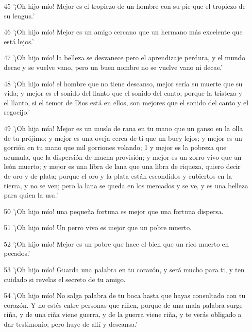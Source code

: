 \par 45 '¡Oh hijo mío! Mejor es el tropiezo de un hombre con su pie que el tropiezo de su lengua.'

\par 46 '¡Oh hijo mío! Mejor es un amigo cercano que un hermano más excelente que está lejos.'

\par 47 '¡Oh hijo mío! la belleza se desvanece pero el aprendizaje perdura, y el mundo decae y se vuelve vano, pero un buen nombre no se vuelve vano ni decae.'

\par 48 '¡Oh hijo mío! el hombre que no tiene descanso, mejor sería su muerte que su vida; y mejor es el sonido del llanto que el sonido del canto; porque la tristeza y el llanto, si el temor de Dios está en ellos, son mejores que el sonido del canto y el regocijo.'

\par 49 '¡Oh hija mía! Mejor es un muslo de rana en tu mano que un ganso en la olla de tu prójimo; y mejor es una oveja cerca de ti que un buey lejos; y mejor es un gorrión en tu mano que mil gorriones volando; 1 y mejor es la pobreza que acumula, que la dispersión de mucha provisión; y mejor es un zorro vivo que un león muerto; y mejor es una libra de lana que una libra de riqueza, quiero decir de oro y de plata; porque el oro y la plata están escondidos y cubiertos en la tierra, y no se ven; pero la lana se queda en los mercados y se ve, y es una belleza para quien la usa.'

\par 50 '¡Oh hijo mío! una pequeña fortuna es mejor que una fortuna dispersa.

\par 51 '¡Oh hijo mío! Un perro vivo es mejor que un pobre muerto.

\par 52 '¡Oh hijo mío! Mejor es un pobre que hace el bien que un rico muerto en pecados.'

\par 53 '¡Oh hijo mío! Guarda una palabra en tu corazón, y será mucho para ti, y ten cuidado si revelas el secreto de tu amigo.

\par 54 '¡Oh hijo mío! No salga palabra de tu boca hasta que hayas consultado con tu corazón. Y no estés entre personas que riñen, porque de una mala palabra surge riña, y de una riña viene guerra, y de la guerra viene riña, y te verás obligado a dar testimonio; pero huye de allí y descansa.'

